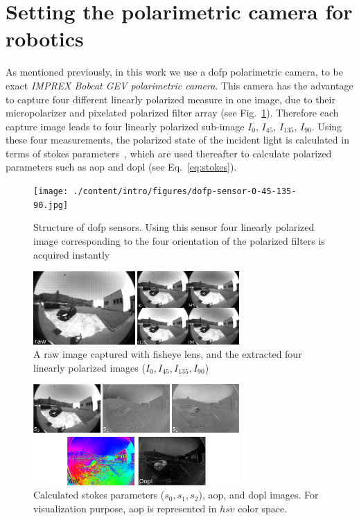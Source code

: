 \graphicspath{{./content/intro/figures/}}
\section{Setting the polarimetric camera for robotics}
\label{sec:rosify}

As mentioned previously, in this work we use a \gls{dofp} polarimetric camera,
to be exact \textit{IMPREX Bobcat GEV polarimetric camera}.
This camera has the advantage to capture four different linearly polarized
measure in one image, due to their micropolarizer and pixelated polarized
filter array (see Fig.~\ref{fig:dofp-sensor}).
Therefore each capture image leads to four linearly polarized sub-image $I_0$,
$I_{45}$, $I_{135}$, $I_{90}$.
Using these four measurements, the polarized state of the incident light is
calculated in terms of stokes parameters~\cite{goldstein2017polarized}, which
are used thereafter to calculate polarized parameters such as \gls{aop} and
\gls{dopl} (see Eq.~\ref{eq:stokes}).

\begin{figure}
  \centering
  \texttt{[image: ./content/intro/figures/dofp-sensor-0-45-135-90.jpg]}
  \caption{Structure of \gls{dofp} sensors. Using this sensor four linearly
    polarized image corresponding to the four orientation of the polarized
    filters is acquired instantly}
    \label{fig:dofp-sensor}
\end{figure}

\begin{figure}
  \centering
  \includegraphics[width=0.7\textwidth]{./content/intro/figures/raw-sp.jpg}
  \caption{A raw image captured with fisheye lens, and the extracted four
    linearly polarized images ($I_0, I_{45}, I_{135}, I_{90}$)}
  \label{fig:raw-sp}
\end{figure}

\begin{figure}
  \centering
  \includegraphics[width=0.7\textwidth]{./content/intro/figures/stokes_aop_dop.jpg}
  \caption{Calculated stokes parameters ($s_0, s_1, s_2$), \gls{aop}, and
    \gls{dopl} images. For visualization purpose, \gls{aop} is represented in
    $hsv$ color space.}
  \label{fig:stokes-aop-dop}
\end{figure}




